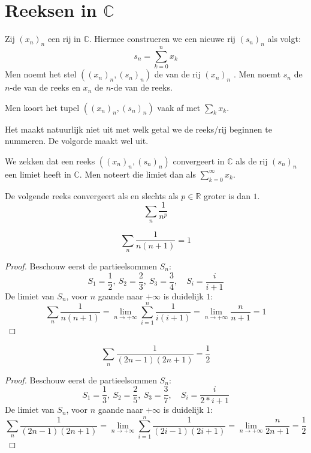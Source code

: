 \documentclass[main.tex]{subfiles}
\begin{document}
\section{Reeksen in $\mathbb{C}$}
\label{sec:reeksen-mathbbc}

\begin{de}
  Zij $(x_{n})_{n}$ een rij in $\mathbb{C}$.
  Hiermee construeren we een nieuwe rij $(s_{n})_{n}$ als volgt:
  \[  s_{n} = \sum_{k=0}^{n}x_{k}  \]
  Men noemt het stel $((x_{n})_{n}, (s_{n})_{n})$ de  van de rij $(x_{n})_{n}$ .
  Men noemt $s_{n}$ de $n$-de  van de reeks en $x_{n}$ de $n$-de  van de reeks.
\end{de}

\begin{de}
  Men koort het tupel $((x_{n})_{n}, (s_{n})_{n})$ vaak af met $\sum_{k}x_{k}$.
\end{de}

\begin{opm}
  Het maakt natuurlijk niet uit met welk getal we de reeks/rij beginnen te nummeren.
  De volgorde maakt wel uit. \needed
\end{opm}

\begin{de}
  We zekken dat een reeks $((x_{n})_{n}, (s_{n})_{n})$ convergeert in $\mathbb{C}$ als de rij $(s_{n})_{n}$ een limiet heeft in $\mathbb{C}$.
  Men noteert die limiet dan als $\sum_{k=0}^{\infty}x_{k}$.
\end{de}

\begin{vb}
  De volgende reeks convergeert als en slechts als $p \in \mathbb{R}$ groter is dan $1$.
  \[ \sum_{n}\frac{1}{n^{p}} \]
\end{vb}


\begin{vb}
  \[ \sum_{n}\frac{1}{n(n+1)} = 1 \]

  \begin{proof}
    Beschouw eerst de partieelsommen $S_{n}$:
    \[ S_{1} = \frac{1}{2},\ S_{2} = \frac{2}{3},\ S_{3} = \frac{3}{4},\quad S_{i} = \frac{i}{i+1} \]
    De limiet van $S_{n}$, voor $n$ gaande naar $+\infty$ is duidelijk $1$:
    \[ \sum_{n}\frac{1}{n(n+1)} = \lim_{n\rightarrow +\infty}\sum_{i=1}^{n}\frac{1}{i(i+1)} = \lim_{n\rightarrow +\infty} \frac{n}{n+1} = 1 \]
  \end{proof}
\end{vb}

\begin{vb}
  \[ \sum_{n}\frac{1}{(2n-1)(2n+1)} = \frac{1}{2} \]

  \begin{proof}
    Beschouw eerst de partieelsommen $S_{n}$:
    \[ S_{1} = \frac{1}{3},\ S_{2} = \frac{2}{5},\ S_{3} = \frac{3}{7},\quad S_{i} = \frac{i}{2*i+1} \]
    De limiet van $S_{n}$, voor $n$ gaande naar $+\infty$ is duidelijk $1$:
    \[ \sum_{n}\frac{1}{(2n-1)(2n+1)} = \lim_{n\rightarrow +\infty}\sum_{i=1}^{n}\frac{1}{(2i-1)(2i+1)} = \lim_{n\rightarrow +\infty} \frac{n}{2n+1} = \frac{1}{2} \]
  \end{proof}
\end{vb}
\end{document}
